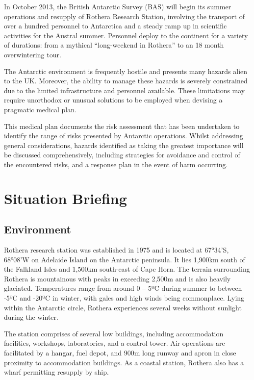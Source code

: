 \documentclass[12pt,a4paper]{article}
\begin{document}
In October 2013, the British Antarctic Survey (BAS) will begin its summer operations and resupply of Rothera Research Station, involving the transport of over a hundred personnel to Antarctica and a steady ramp up in scientific activities for the Austral summer. Personnel deploy to the continent for a variety of durations: from a mythical ``long-weekend in Rothera'' to an 18 month overwintering tour.

The Antarctic environment is frequently hostile and presents many hazards alien to the UK. Moreover, the ability to manage these hazards is severely constrained due to the limited infrastructure and personnel available. These limitations may require unorthodox or unusual solutions to be employed when devising a pragmatic medical plan.

This medical plan documents the risk assessment that has been undertaken to identify the range of risks presented by Antarctic operations. Whilst addressing general considerations, hazards identified as taking the greatest importance will be discussed comprehensively, including strategies for avoidance and control of the encountered risks, and a response plan in the event of harm occurring.

\section{Situation Briefing}

\subsection{Environment}

Rothera research station was established in 1975 and is located at 67°34'S, 68°08'W on Adelaide Island on the Antarctic peninsula. It lies 1,900km south of the Falkland Isles and 1,500km south-east of Cape Horn. The terrain surrounding Rothera is mountainous with peaks in exceeding 2,500m and is also heavily glaciated. Temperatures range from around 0 -- 5ºC during summer to between -5ºC and -20ºC in winter, with gales and high winds being commonplace. Lying within the Antarctic circle, Rothera experiences several weeks without sunlight during the winter.

The station comprises of several low buildings, including accommodation facilities, workshops, laboratories, and a control tower. Air operations are facilitated by a hangar, fuel depot, and 900m long runway and apron in close proximity to accommodation buildings. As a coastal station, Rothera also has a wharf permitting resupply by ship.
\end{document}
